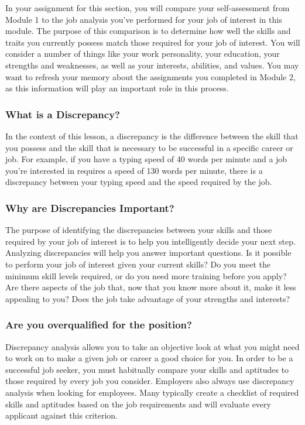 In your assignment for this section, you will compare your self-assessment from Module 1 to the job analysis you've performed for your job of interest in this module. The purpose of this comparison is to determine how well the skills and traits you currently possess match those required for your job of interest. You will consider a number of things like your work personality, your education, your strengths and weaknesses, as well as your interests, abilities, and values. You may want to refresh your memory about the assignments you completed in Module 2, as this information will play an important role in this process.

\subsubsection*{What is a Discrepancy?}
In the context of this lesson, a discrepancy is the difference between the skill that you possess and the skill that is necessary to be successful in a specific career or job. For example, if you have a typing speed of 40 words per minute and a job you're interested in requires a speed of 130 words per minute, there is a discrepancy between your typing speed and the speed required by the job.

\subsubsection*{Why are Discrepancies Important?}

The purpose of identifying the discrepancies between your skills and those required by your job of interest is to help you intelligently decide your next step. Analyzing discrepancies will help you answer important questions. Is it possible to perform your job of interest given your current skills? Do you meet the minimum skill levels required, or do you need more training before you apply? Are there aspects of the job that, now that you know more about it, make it less appealing to you? Does the job take advantage of your strengths and interests?

\subsubsection*{Are you overqualified for the position?}

Discrepancy analysis allows you to take an objective look at what you might need to work on to make a given job or career a good choice for you. In order to be a successful job seeker, you must habitually compare your skills and aptitudes to those required by every job you consider.
Employers also always use discrepancy analysis when looking for employees. Many typically create a checklist of required skills and aptitudes based on the job requirements and will evaluate every applicant against this criterion.

